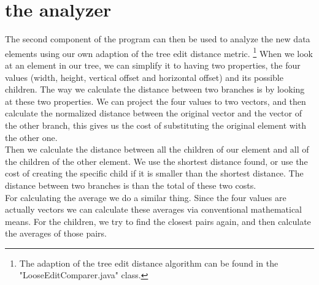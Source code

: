 \section{the analyzer}
The second component of the program can then be used to analyze the new data elements using our own adaption of the tree edit distance metric.%
\footnote{The adaption of the tree edit distance algorithm can be found in the "LooseEditComparer.java" class.}
When we look at an element in our tree, we can simplify it to having two properties, the four values (width, height, vertical offset and horizontal offset) and its possible children. The way we calculate the distance between two branches is by looking at these two properties. We can project the four values to two vectors, and then calculate the normalized distance between the original vector and the vector of the other branch, this gives us the cost of substituting the original element with the other one.\\
Then we calculate the distance between all the children of our element and all of the children of the other element. We use the shortest distance found, or use the cost of creating the specific child if it is smaller than the shortest distance. The distance between two branches is than the total of these two costs.\\
For calculating the average we do a similar thing. Since the four values are actually vectors we can calculate these averages via conventional mathematical means. For the children, we try to find the closest pairs again, and then calculate the averages of those pairs.

